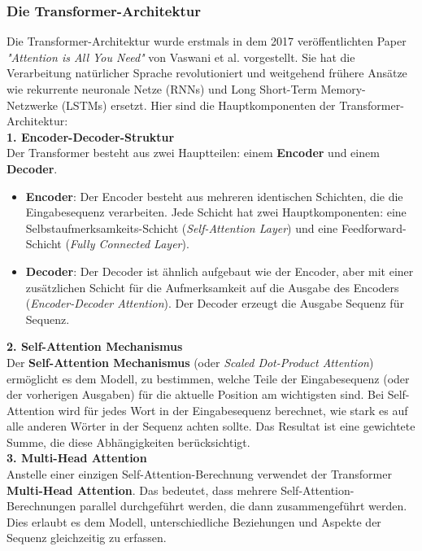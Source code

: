 \documentclass[12pt]{article}
\begin{document}
\subsubsection{Die Transformer-Architektur}
%
Die Transformer-Architektur wurde erstmals in dem 2017 veröffentlichten Paper \textit{"Attention is All You Need"} von Vaswani et al. vorgestellt. Sie hat die Verarbeitung natürlicher Sprache revolutioniert und weitgehend frühere Ansätze wie rekurrente neuronale Netze (RNNs) und Long Short-Term Memory-Netzwerke (LSTMs) ersetzt. Hier sind die Hauptkomponenten der Transformer-Architektur: \\[0.2cm]
%
\textbf{1. Encoder-Decoder-Struktur}\\
Der Transformer besteht aus zwei Hauptteilen: einem \textbf{Encoder} und einem \textbf{Decoder}.
\begin{itemize}
    \item \textbf{Encoder}: Der Encoder besteht aus mehreren identischen Schichten, die die Eingabesequenz verarbeiten. Jede Schicht hat zwei Hauptkomponenten: eine Selbstaufmerksamkeits-Schicht (\textit{Self-Attention Layer}) und eine Feedforward-Schicht (\textit{Fully Connected Layer}).
    \item \textbf{Decoder}: Der Decoder ist ähnlich aufgebaut wie der Encoder, aber mit einer zusätzlichen Schicht für die Aufmerksamkeit auf die Ausgabe des Encoders (\textit{Encoder-Decoder Attention}). Der Decoder erzeugt die Ausgabe Sequenz für Sequenz.
\end{itemize}
%
\textbf{2. Self-Attention Mechanismus}\\
Der \textbf{Self-Attention Mechanismus} (oder \textit{Scaled Dot-Product Attention}) ermöglicht es dem Modell, zu bestimmen, welche Teile der Eingabesequenz (oder der vorherigen Ausgaben) für die aktuelle Position am wichtigsten sind. Bei Self-Attention wird für jedes Wort in der Eingabesequenz berechnet, wie stark es auf alle anderen Wörter in der Sequenz achten sollte. Das Resultat ist eine gewichtete Summe, die diese Abhängigkeiten berücksichtigt.\\[0.2cm]
%
\textbf{3. Multi-Head Attention}\\
Anstelle einer einzigen Self-Attention-Berechnung verwendet der Transformer \textbf{Multi-Head Attention}. Das bedeutet, dass mehrere Self-Attention-Berechnungen parallel durchgeführt werden, die dann zusammengeführt werden. Dies erlaubt es dem Modell, unterschiedliche Beziehungen und Aspekte der Sequenz gleichzeitig zu erfassen.\\[0.2cm]
\end{document}
